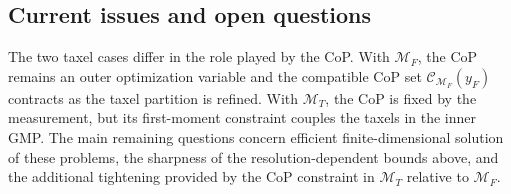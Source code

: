 \documentclass[11pt,a4paper]{article}
\theoremstyle{proposition}
\begin{document}
\subsection{Current issues and open questions}

The two taxel cases differ in the role played by the CoP. With
$\mathcal M_F$, the CoP remains an outer optimization variable and the
compatible CoP set $\mathcal C_{\mathcal M_F}(y_F)$ contracts as the taxel
partition is refined. With $\mathcal M_T$, the CoP is fixed by the measurement,
but its first-moment constraint couples the taxels in the inner GMP. The main
remaining questions concern efficient finite-dimensional solution of these
problems, the sharpness of the resolution-dependent bounds above, and the
additional tightening provided by the CoP constraint in $\mathcal M_T$ relative
to $\mathcal M_F$.

\end{document}
